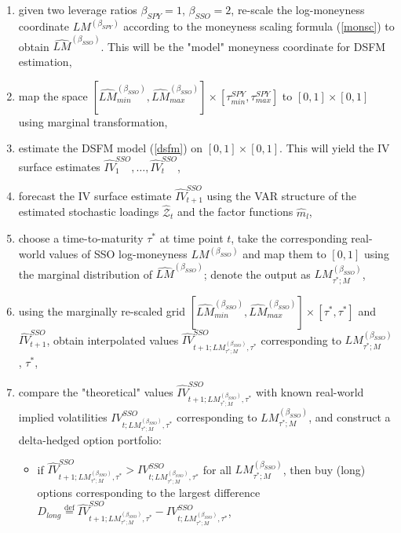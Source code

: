 \documentclass{rQUF2e}
\theoremstyle{plain}
\theoremstyle{definition}
\begin{document}
	\begin{enumerate}
		\item
		given two leverage ratios $\beta_{SPY} = 1$, $\beta_{SSO} = 2$, re-scale the log-moneyness coordinate $LM^{(\beta_{SPY})}$ according to the moneyness scaling formula (\ref{monsc}) to obtain $\widehat{LM}^{(\beta_{SSO})}$. This will be the "model" moneyness coordinate for DSFM estimation,
		\item
		map the space $[\widehat{LM}_{min}^{(\beta_{SSO})}, \widehat{LM}_{max}^{(\beta_{SSO})}] \times [\tau_{min}^{SPY}, \tau_{max}^{SPY}]$ to $[0,1] \times [0,1]$ using marginal transformation,
		\item
		estimate the DSFM model (\ref{dsfm}) on $[0,1] \times [0,1]$. This will yield the IV surface estimates $\widehat{IV}_1^{SSO},\ldots,\widehat{IV}_t^{SSO}$,
		\item
		forecast the IV surface estimate $\widehat{IV}_{t+1}^{SSO}$ using the VAR structure of the estimated stochastic loadings $\widehat{\mathcal{Z}}_{t}$ and the factor functions $\widehat{m}_{l}$,
		\item
		choose a time-to-maturity $\tau^*$ at time point $t$, take the corresponding real-world values of SSO log-moneyness $LM^{(\beta_{SSO})}$ and map them to $[0,1]$ using the marginal distribution of $\widehat{LM}^{(\beta_{SSO})}$; denote the output as $LM^{(\beta_{SSO})}_{ \tau^*; M }$,
		\item
		using the marginally re-scaled grid $[\widehat{LM}_{min}^{(\beta_{SSO})}, \widehat{LM}_{max}^{(\beta_{SSO})}] \times [\tau^*, \tau^*]$ and $\widehat{IV}_{t+1}^{SSO}$, obtain interpolated values $\widehat{IV}^{SSO}_{t+1; LM^{(\beta_{SSO})}_{\tau^*; M}, \tau^*}$ corresponding to $LM^{(\beta_{SSO})}_{\tau^*; M}$, $\tau^{*}$,
		\item
		compare the "theoretical" values $\widehat{IV}^{SSO}_{t+1; LM^{(\beta_{SSO})}_{\tau^*; M}, \tau^*}$ with known real-world implied volatilities $IV^{SSO}_{t; LM^{(\beta_{SSO})}_{\tau^*; M}, \tau^*}$ corresponding to $LM^{(\beta_{SSO})}_{\tau^*; M}$, and construct a delta-hedged option portfolio: 
		\begin{itemize}
			\item
			if $\widehat{IV}^{SSO}_{t+1; LM^{(\beta_{SSO})}_{\tau^*; M}, \tau^*} > IV^{SSO}_{t; LM^{(\beta_{SSO})}_{\tau^*; M}, \tau^*}$ for all $LM^{(\beta_{SSO})}_{\tau^*; M}$, then buy (long) options corresponding to the largest difference $D_{long} \stackrel{\operatorname{def}}{=} \widehat{IV}^{SSO}_{t+1; LM^{(\beta_{SSO})}_{\tau^*; M}, \tau^*} - IV^{SSO}_{t; LM^{(\beta_{SSO})}_{\tau^*; M}, \tau^*}$,

\end{itemize}
\end{enumerate}
\end{document}

